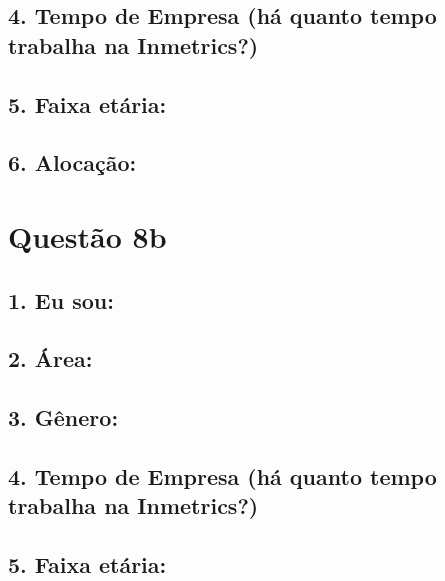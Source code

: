 \documentclass[]{book}
\begin{document}
\hypertarget{tempo-de-empresa-ha-quanto-tempo-trabalha-na-inmetrics}{%
\subsection{4. Tempo de Empresa (há quanto tempo trabalha na Inmetrics?)}\label{tempo-de-empresa-ha-quanto-tempo-trabalha-na-inmetrics}}

\hypertarget{faixa-etaria}{%
\subsection{5. Faixa etária:}\label{faixa-etaria}}

\hypertarget{alocacao}{%
\subsection{6. Alocação:}\label{alocacao}}

\hypertarget{questao-8b}{%
\section{Questão 8b}\label{questao-8b}}

\hypertarget{eu-sou-1}{%
\subsection{1. Eu sou:}\label{eu-sou-1}}

\hypertarget{area-1}{%
\subsection{2. Área:}\label{area-1}}

\hypertarget{genero-1}{%
\subsection{3. Gênero:}\label{genero-1}}

\hypertarget{tempo-de-empresa-ha-quanto-tempo-trabalha-na-inmetrics-1}{%
\subsection{4. Tempo de Empresa (há quanto tempo trabalha na Inmetrics?)}\label{tempo-de-empresa-ha-quanto-tempo-trabalha-na-inmetrics-1}}

\hypertarget{faixa-etaria-1}{%
\subsection{5. Faixa etária:}\label{faixa-etaria-1}}
\end{document}
